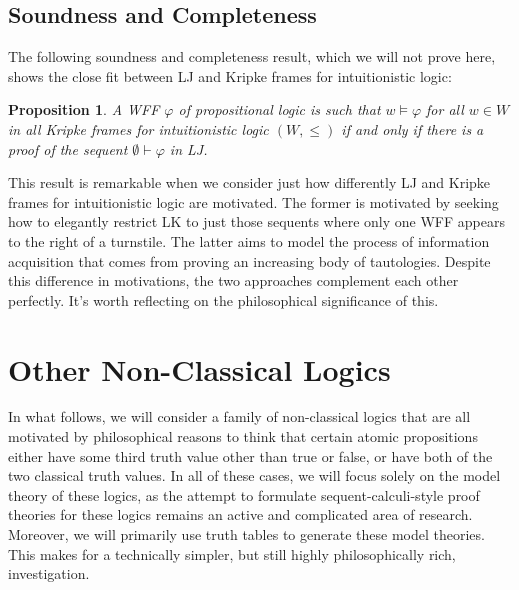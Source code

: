 \documentclass[11pt]{article}
\newtheorem{proposition}[theorem]{Proposition}
\theoremstyle{definition}
\theoremstyle{remark}
\begin{document}
\subsection{Soundness and Completeness}
The following soundness and completeness result, which we will not prove here, shows the close fit between LJ and Kripke frames for intuitionistic logic:
\begin{proposition}
    A WFF $\varphi$ of propositional logic is such that $w\vDash\varphi$ for all $w\in W$ in all Kripke frames for intuitionistic logic $(W,\leq)$ if and only if there is a proof of the sequent $\emptyset\vdash\varphi$ in LJ.
\end{proposition}
\noindent
This result is remarkable when we consider just how differently LJ and Kripke frames for intuitionistic logic are motivated. The former is motivated by seeking how to elegantly restrict LK to just those sequents where only one WFF appears to the right of a turnstile. The latter aims to model the process of information acquisition that comes from proving an increasing body of tautologies. Despite this difference in motivations, the two approaches complement each other perfectly. It's worth reflecting on the philosophical significance of this.\par 

\section{Other Non-Classical Logics}
In what follows, we will consider a family of non-classical logics that are all motivated by philosophical reasons to think that certain atomic propositions either have some third truth value other than true or false, or have both of the two classical truth values. In all of these cases, we will focus solely on the model theory of these logics, as the attempt to formulate sequent-calculi-style proof theories for these logics remains an active and complicated area of research. Moreover, we will primarily use truth tables to generate these model theories. This makes for a technically simpler, but still highly philosophically rich, investigation.
\end{document}
